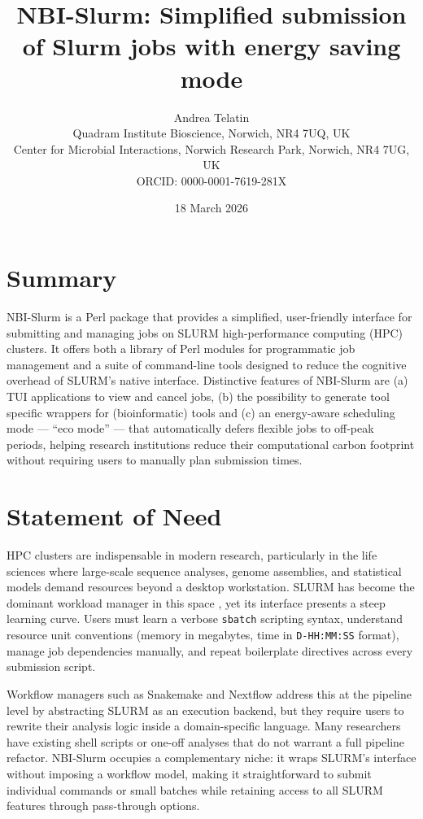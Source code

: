 \documentclass[
]{article}
\title{NBI-Slurm: Simplified submission of Slurm jobs with energy saving
mode}
\author{Andrea Telatin\\
Quadram Institute Bioscience, Norwich, NR4 7UQ, UK\\
Center for Microbial Interactions, Norwich Research Park, Norwich, NR4 7UG, UK\\
ORCID: 0000-0001-7619-281X}
\date{18 March 2026}
\begin{document}
\maketitle

\section{Summary}\label{summary}

NBI-Slurm is a Perl package that provides a simplified, user-friendly
interface for submitting and managing jobs on SLURM
\citep{jette2002slurm} high-performance computing (HPC) clusters. It
offers both a library of Perl modules for programmatic job management
and a suite of command-line tools designed to reduce the cognitive
overhead of SLURM's native interface. Distinctive features of NBI-Slurm
are (a) TUI applications to view and cancel jobs, (b) the possibility to
generate tool specific wrappers for (bioinformatic) tools and (c) an
energy-aware scheduling mode --- ``eco mode'' --- that automatically
defers flexible jobs to off-peak periods, helping research institutions
reduce their computational carbon footprint without requiring users to
manually plan submission times.

\section{Statement of Need}\label{statement-of-need}

HPC clusters are indispensable in modern research, particularly in the
life sciences where large-scale sequence analyses, genome assemblies,
and statistical models demand resources beyond a desktop workstation.
SLURM has become the dominant workload manager in this space
\citep{slurm_adoption}, yet its interface presents a steep learning
curve. Users must learn a verbose \texttt{sbatch} scripting syntax,
understand resource unit conventions (memory in megabytes, time in
\texttt{D-HH:MM:SS} format), manage job dependencies manually, and
repeat boilerplate directives across every submission script.

Workflow managers such as Snakemake \citep{molder2021snakemake} and
Nextflow \citep{di2017nextflow} address this at the pipeline level by
abstracting SLURM as an execution backend, but they require users to
rewrite their analysis logic inside a domain-specific language. Many
researchers have existing shell scripts or one-off analyses that do not
warrant a full pipeline refactor. NBI-Slurm occupies a complementary
niche: it wraps SLURM's interface without imposing a workflow model,
making it straightforward to submit individual commands or small batches
while retaining access to all SLURM features through pass-through
options.
\end{document}
